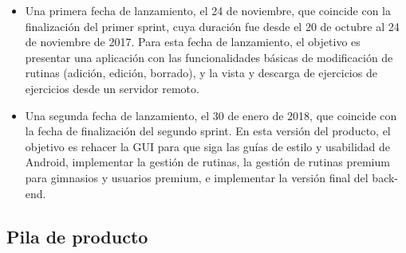 \documentclass[11pt,a4paper]{report}
\begin{document}
\begin{itemize}
	\item Una primera fecha de lanzamiento, el 24 de noviembre, que coincide con la finalización del primer sprint, cuya duración fue desde el 20 de octubre al 24 de noviembre de 2017. Para esta fecha de lanzamiento, el objetivo es presentar una aplicación con las funcionalidades básicas de modificación de rutinas (adición, edición, borrado), y la  vista y descarga de ejercicios de ejercicios desde un servidor remoto.
	\item Una segunda fecha de lanzamiento, el 30 de enero de 2018,  que coincide con la fecha de finalización del segundo sprint. En esta versión del producto, el objetivo es rehacer la GUI para que siga las guías de estilo y usabilidad de Android, implementar la gestión de rutinas, la gestión de rutinas premium para gimnasios y usuarios premium, e implementar la versión final del back-end.
\end{itemize}



\subsection{Pila de producto}
\end{document}
